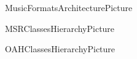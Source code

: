\documentclass[11pt,a4paper]{report}
\begin{document}
\useRegularPagesHeadersAndFooters

{MusicFormatsArchitecturePicture}

{MSRClassesHierarchyPicture}

{OAHClassesHierarchyPicture}



\useListsPagesHeadersAndFooters


\end{document}
